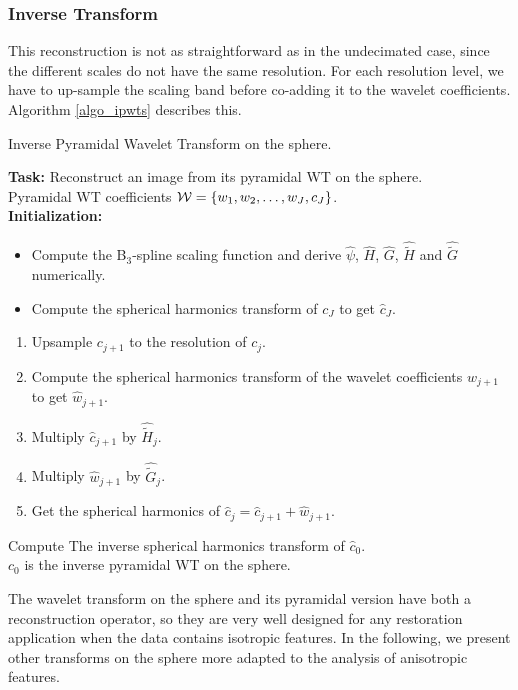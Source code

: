 \subsubsection{Inverse Transform}
 
This reconstruction is not as straightforward as in the undecimated case, since the different scales do not have the same resolution.
For each resolution level, we have to up-sample the scaling band before co-adding it to the wavelet coefficients. Algorithm \ref{algo_ipwts} describes this.
{\linespread{1}
\begin{algorithm}[h]
\caption{Inverse Pyramidal Wavelet Transform on the sphere.}
\label{algo_ipwts}
{\bf Task:} Reconstruct an image from its pyramidal WT on the sphere.\\
 Pyramidal WT coefficients ${\cal W}=\{w_1, w_2, \dots, w_{J}, c_{J}\}$.\\
{\bf Initialization:}
\begin{itemize}
\item Compute the B$_3$-spline scaling function and derive $\hat{\psi}$, $\widehat{H}$, $\widehat{G}$, $\widehat{\tilde H}$ and $\widehat{\tilde G}$ numerically.
\item Compute the spherical harmonics transform of $c_J$ to get ${\hat c}_J$.
\end{itemize}
 {
\begin{enumerate}[1.]
\item Upsample $c_{j+1}$ to the resolution of $c_j$.
\item Compute the spherical harmonics transform of the wavelet coefficients $w_{j+1}$ to get $\hat{w}_{j+1}$.
\item Multiply $\hat{c}_{j+1}$ by ${\widehat {\tilde H}}_{j}$.
\item Multiply $\hat{w}_{j+1}$ by ${\widehat {\tilde G}}_{j}$.
\item Get the spherical harmonics of $\hat{c}_j=\hat{c}_{j+1}+\hat{w}_{j+1}$.
\end{enumerate}
}
Compute The inverse spherical harmonics transform of $\hat c_0$.\\
 $c_0$ is the inverse pyramidal WT on the sphere.
\end{algorithm}
}
  
The wavelet transform on the sphere and its pyramidal version have both a reconstruction operator, 
so they are very well designed for any restoration application when the data contains isotropic features. 
In the following, we present other transforms on the sphere more adapted to the analysis of anisotropic features.





